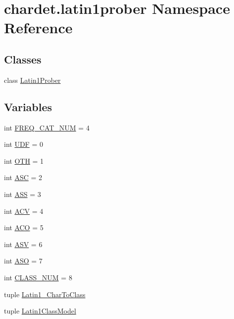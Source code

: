 \hypertarget{namespacechardet_1_1latin1prober}{}\section{chardet.\+latin1prober Namespace Reference}
\label{namespacechardet_1_1latin1prober}
\subsection*{Classes}
\begin{DoxyCompactItemize}
\item 
class \hyperlink{classchardet_1_1latin1prober_1_1_latin1_prober}{Latin1\+Prober}
\end{DoxyCompactItemize}
\subsection*{Variables}
\begin{DoxyCompactItemize}
\item 
int \hyperlink{namespacechardet_1_1latin1prober_a63aff35c9c393fc31c9424de26ea1d4e}{F\+R\+E\+Q\+\_\+\+C\+A\+T\+\_\+\+N\+UM} = 4
\item 
int \hyperlink{namespacechardet_1_1latin1prober_ab1bb8f17f1e967a47a7c62382b1d4d5d}{U\+DF} = 0
\item 
int \hyperlink{namespacechardet_1_1latin1prober_a6371206a72b164e925eeaf37e4c9e924}{O\+TH} = 1
\item 
int \hyperlink{namespacechardet_1_1latin1prober_a2f5156dc0ef9eaf5e1614662c24b5c18}{A\+SC} = 2
\item 
int \hyperlink{namespacechardet_1_1latin1prober_aec3e30a39ee58c5a15db352ebc0fe581}{A\+SS} = 3
\item 
int \hyperlink{namespacechardet_1_1latin1prober_a7132de961942fa1e3cacc82cbeb22748}{A\+CV} = 4
\item 
int \hyperlink{namespacechardet_1_1latin1prober_a7e65f179b4496a65ad33c151f839afab}{A\+CO} = 5
\item 
int \hyperlink{namespacechardet_1_1latin1prober_a04228f525f0360d64a7c943152a26f23}{A\+SV} = 6
\item 
int \hyperlink{namespacechardet_1_1latin1prober_a8dcd58023b9760b81c6fbf2a7804df9a}{A\+SO} = 7
\item 
int \hyperlink{namespacechardet_1_1latin1prober_a37cffb523983bcf23bd96a4bf2cbc261}{C\+L\+A\+S\+S\+\_\+\+N\+UM} = 8
\item 
tuple \hyperlink{namespacechardet_1_1latin1prober_a47ace28713715789a9dccd79d3d7cffe}{Latin1\+\_\+\+Char\+To\+Class}
\item 
tuple \hyperlink{namespacechardet_1_1latin1prober_aa61d9475089515b6d78a30e1b7a9697f}{Latin1\+Class\+Model}
\end{DoxyCompactItemize}


